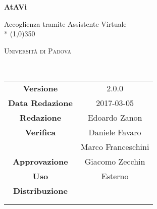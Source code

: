 \documentclass[a4paper,12pt]{article}
\date{12/12/2016}
\begin{document}
	\begin{titlepage}
		\centering
		{\huge\bfseries AtAVi\par}
		Accoglienza tramite Assistente Virtuale \\*
		\line(1,0){350} \\
		{\scshape\LARGE Università di Padova \par}
		\vspace{1cm}
		{\scshape\Large \pianodiprogettoi\ \par}
		\logo
		\newpage
		\begin{tabular}{c|c}
			{\hfill \textbf{Versione}} 			& 2.0.0			\\ 
			{\hfill\textbf{Data Redazione}} 	& 2017-03-05 		\\ 
			{\hfill\textbf{Redazione}} 			& Edoardo Zanon \\
			{\hfill\textbf{Verifica}} 			& Daniele Favaro \\ & Marco Franceschini \\ 
			{\hfill\textbf{Approvazione}} 		& Giacomo Zecchin \\
			{\hfill\textbf{Uso}} 				& Esterno 			\\
			{\hfill\textbf{Distribuzione}} 		& \vardanega \\ & \cardin \\ & \prop \\
		\end{tabular}
	\end{titlepage}
	
	\pagestyle{myfront}
	\newpage	
			

	\newpage
		\tableofcontents 	%
	\newpage
		\listoftables 		%
	\newpage	
		\listoffigures		%
	
	\label{LastFrontPage}
		\newpage
		\pagestyle{mymain}
			
		\newpage
			
		\newpage	
			
		\newpage			
			
		\newpage			
			
		\newpage			
			
		\newpage
			

	\label{LastPage}
\end{document}
